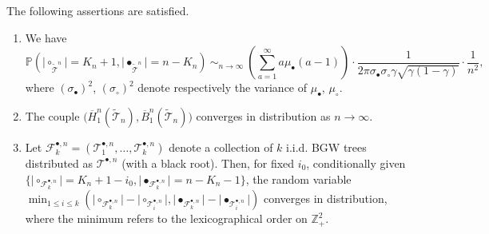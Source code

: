 \documentclass[AHL,XML,longabstracts,Unicode]{cedram}
\providecommand{\abs}[1]{\lvert#1\rvert}
\newcommand{\Z}{\mathbb{Z}}
\def\sc{\sigma_{\circ}}
\def\sb{\sigma_{\bullet}}
\def\mub{\mu_{\bullet}}
\def\muc{\mu_{\circ}}
\def\oB{\overline{B}}
\def\oH{\overline{H}}
\def\tTs{\tilde{\Ts}}
\def \Tsbn{\Ts^{\bullet,n}}
\def\Ts{\mathscr{T}}
\renewcommand\Pr[1]{\mathbb{P}\left(#1\right)}
\begin{document}
\begin{lemma}\label{lem:tilde}The following assertions are satisfied.
\begin{enumerate}
\item[(i)] We have
\[\Pr{\abs{\circ_{\tTs^{n}}}=K_{n}+1, \abs{\bullet_{\tTs^{n}}}=n-K_{n}}   \ \mathop{\sim}_{n \rightarrow \infty} \ \left( \sum_{a=1}^{\infty} a \mub(a-1) \right)\cdot \frac{1}{ 2\pi \sb \sc  \gamma \sqrt{\gamma(1-\gamma)} } \cdot \frac{1}{n^{2}},\]
where $(\sb)^{2}$, $(\sc)^{2}$ denote respectively the variance of $\mub$, $\muc$.
\item[(ii)] The couple $\big(\oH^{n}_{1}(\tTs_{n}),\oB^{n}_{1}(\tTs_{n})\big)$ converges in distribution as $n \rightarrow \infty$.
\item[(iii)] Let  $ \mathscr{F}^{\bullet,n}_{k} =(\Ts^{\bullet,n}_{1}, \ldots, \Ts^{\bullet,n}_{k})$ denote a collection of $k$ i.i.d. BGW trees distributed as  $ \Tsbn$ (with a black root). Then, for fixed $i_{0}$, conditionally given $ \{ \abs{\circ_{\mathscr{F}^{\bullet,n}_{k}}}=K_{n}+1-i_{0},\abs{\bullet_{\mathscr{F}^{\bullet,n}_{k}}}=n-K_{n}-1 \} $, the random variable $ \min_{1 \leq i \leq k} (\abs{\circ_{\mathscr{F}^{\bullet,n}_{k}}}- \abs{\circ_{\Ts^{\bullet,n}_{i}}},\abs{\bullet_{\mathscr{F}^{\bullet,n}_{k}}}- \abs{\bullet_{\Ts^{\bullet,n}_{i}}})$ converges in distribution, where the minimum refers to the lexicographical order on $\Z_{+}^{2}$.
\end{enumerate}
\end{lemma}
\end{document}
